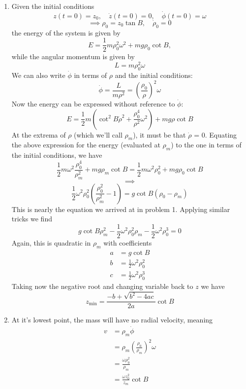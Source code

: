 \documentclass[12pt]{article}
\begin{document}
\begin{enumerate}[label=(\alph*)]
    \item Given the initial conditions
    \[ z(t=0) = z_0, \quad \dot{z}(t=0) = 0, \quad \dot{\phi}(t=0) = \omega \]
    \[ \implies \rho_0 = z_0\tan B, \quad \dot{\rho}_0 = 0  \]
    the energy of the system is given by
    \[ E = \frac{1}{2}m\rho_0^2\omega^2 + mg\rho_0\cot B, \]
    while the angular momentum is given by 
    \[ L = m\rho_0^2\omega \]
    We can also write $\dot{\phi}$ in terms of $\rho$ and the initial conditions:
    \[ \dot{\phi} = \frac{L}{m\rho^2} = \left(\frac{\rho_0}{\rho}\right)^2\omega \]
    Now the energy can be expressed without reference to $\dot{\phi}$:
    \[ E = \frac{1}{2}m\left(\cot^2B\dot{\rho}^2 + \frac{\rho_0^4}{\rho^2}\omega^2\right) + mg\rho\cot B \]
    At the extrema of $\rho$ (which we'll call $\rho_m$), it must be that $\dot{\rho}$ = 0. Equating the above expression for the energy (evaluated at $\rho_m$) to the one in terms of the initial conditions, we have
    \[ \frac{1}{2}m\omega^2\frac{\rho_0^4}{\rho_m^2} + mg\rho_m\cot B = \frac{1}{2}m\omega^2\rho_0^2+ mg\rho_0\cot B \] 
    \[ \implies \]
    \[ \frac{1}{2}\omega^2\rho_0^2\left(\frac{\rho_0^2}{\rho_m^2} - 1\right) = g\cot B \left(\rho_0 - \rho_m\right) \]
    This is nearly the equation we arrived at in problem 1. Applying similar tricks we find
    \[ g\cot B \rho_m^2 - \frac{1}{2}\omega^2\rho_0^2\rho_m - \frac{1}{2}\omega^2\rho_0^3 = 0 \]
    Again, this is quadratic in $\rho_m$ with coefficients
    \begin{align*}
        a &= g\cot B \\
        b &= \frac{1}{2}\omega^2\rho_0^2 \\
        c &= \frac{1}{2}\omega^2\rho_0^3
    \end{align*}
    Taking now the negative root and changing variable back to $z$ we have
    \[ \boxed{z_\text{min} = \frac{-b + \sqrt{b^2 -4ac}}{2a}\cot B } \]

    \item At it's lowest point, the mass will have no radial velocity, meaning
    \begin{align*}
        v &= \rho_m\dot{\phi} \\
        &= \rho_m \left(\frac{\rho_0}{\rho_m}\right)^2\omega \\
        &= \frac{\omega\rho_0^2}{\rho_m} \\
        &= \boxed{\frac{\omega z_0^2}{z_m}\cot B}
    \end{align*}
\end{enumerate}
\end{document}
